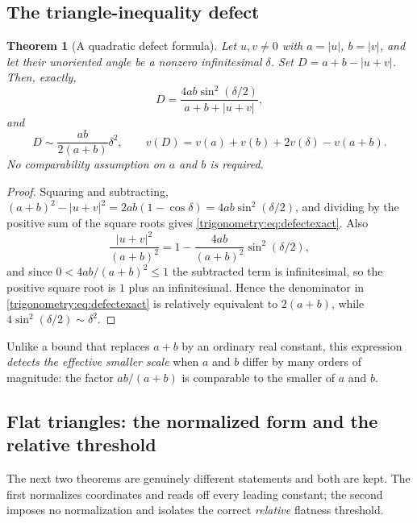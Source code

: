 \documentclass[11pt,letterpaper]{article}
\numberwithin{equation}{section}
\newtheorem{theorem}{Theorem}[section]
\theoremstyle{definition}
\theoremstyle{remark}
\begin{document}
\subsection{The triangle-inequality defect}
\begin{theorem}[A quadratic defect formula]\label{trigonometry:thm:defect}
Let $u,v\ne0$ with $a=|u|$, $b=|v|$, and let their unoriented angle be a nonzero infinitesimal
$\delta$. Set $D=a+b-|u+v|$. Then, exactly,
\begin{equation}\label{trigonometry:eq:defectexact}
 D=\frac{4ab\sin^2(\delta/2)}{a+b+|u+v|},
\end{equation}
and
\begin{equation}\label{trigonometry:eq:defectasym}
 D\sim\frac{ab}{2(a+b)}\delta^2,\qquad
 v(D)=v(a)+v(b)+2v(\delta)-v(a+b).
\end{equation}
\emph{No comparability assumption on $a$ and $b$ is required.}
\end{theorem}
\begin{proof}
Squaring and subtracting, $(a+b)^2-|u+v|^2=2ab(1-\cos\delta)=4ab\sin^2(\delta/2)$, and dividing by
the positive sum of the square roots gives \cref{trigonometry:eq:defectexact}. Also
\[
 \frac{|u+v|^2}{(a+b)^2}=1-\frac{4ab}{(a+b)^2}\sin^2(\delta/2),
\]
and since $0<4ab/(a+b)^2\le1$ the subtracted term is infinitesimal, so the positive square root is
$1$ plus an infinitesimal. Hence the denominator in \cref{trigonometry:eq:defectexact} is
relatively equivalent to $2(a+b)$, while $4\sin^2(\delta/2)\sim\delta^2$.
\end{proof}
Unlike a bound that replaces $a+b$ by an ordinary real constant, this expression \emph{detects the
effective smaller scale} when $a$ and $b$ differ by many orders of magnitude: the factor
$ab/(a+b)$ is comparable to the smaller of $a$ and $b$.

\subsection{Flat triangles: the normalized form and the relative threshold}
The next two theorems are genuinely different statements and both are kept. The first normalizes
coordinates and reads off every leading constant; the second imposes no normalization and isolates
the correct \emph{relative} flatness threshold.
\end{document}
